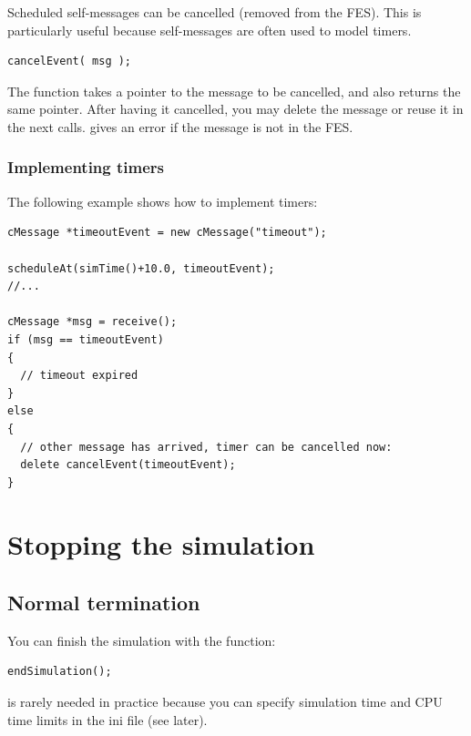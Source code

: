 Scheduled self-messages can be cancelled
 (removed from the FES).
This is particularly useful because self-messages are often used
to model timers.

\begin{verbatim}
cancelEvent( msg );
\end{verbatim}

The  function takes a pointer to the message to
be cancelled, and also returns the same pointer. After having it
cancelled, you may delete the message or reuse it in the next
 calls.  gives an error if
the message is not in the FES.


\subsubsection{Implementing timers}

The following example shows how to implement timers:

\begin{verbatim}
cMessage *timeoutEvent = new cMessage("timeout");

scheduleAt(simTime()+10.0, timeoutEvent);
//...

cMessage *msg = receive();
if (msg == timeoutEvent)
{
  // timeout expired
}
else
{
  // other message has arrived, timer can be cancelled now:
  delete cancelEvent(timeoutEvent);
}
\end{verbatim}





\section{Stopping the simulation}
\label{sec:simple-modules:stopping}

\subsection{Normal termination}

You can finish the simulation with the  function:

\begin{verbatim}
endSimulation();
\end{verbatim}

 is rarely needed in practice because you
can specify simulation time and CPU time limits
in the ini file (see later).

